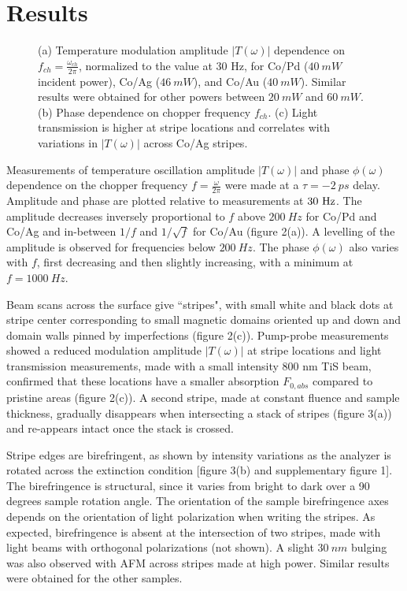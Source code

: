 \documentclass[5p]{elsarticle}
\begin{document}
\section{Results}

\begin{figure}
\centering{}
\caption{\label{fig:Figure1} (a) Temperature modulation amplitude $|T(\omega)|$ dependence on $f_{ch}=\frac{\omega_{ch}}{2 \pi}$, normalized to the value at 30 Hz, for Co/Pd ($40~mW$ incident power), Co/Ag ($46~mW$), and Co/Au ($40~mW$). Similar results were obtained for other powers between $20~mW$ and $60~mW$. (b) Phase dependence on chopper frequency $f_{ch}$. (c) Light transmission is higher at stripe locations and correlates with variations in $|T(\omega)|$ across Co/Ag stripes.}
\end{figure}

Measurements of temperature oscillation amplitude $|T(\omega)|$ and phase $\phi(\omega)$ dependence on the chopper frequency $f=\frac{\omega}{2 \pi}$ were made at a $\tau=-2~ps$ delay. Amplitude and phase are plotted relative to measurements at $\rm 30~Hz$. The amplitude decreases inversely proportional to $f$ above $200~Hz$ for Co/Pd and Co/Ag and in-between $1/f$ and $1/\sqrt{f}$ for Co/Au (figure 2(a)). A levelling of the amplitude is observed for frequencies below $200~Hz$. The phase $\phi(\omega)$ also varies with $f$, first decreasing and then slightly increasing, with a minimum at $f= 1000~Hz$.

Beam scans across the surface give ``stripes", with small white and black dots at stripe center corresponding to small magnetic domains oriented up and down and domain walls pinned by imperfections (figure 2(c)). Pump-probe measurements showed a reduced modulation amplitude $|T(\omega)|$ at stripe locations and light transmission measurements, made with a small intensity 800 nm TiS beam, confirmed that these locations have a smaller absorption $F_{0,abs}$ compared to pristine areas (figure 2(c)). A second stripe, made at constant fluence and sample thickness, gradually disappears when intersecting a stack of stripes (figure 3(a)) and re-appears intact once the stack is crossed.

Stripe edges are birefringent, as shown by intensity variations as the analyzer is rotated across the extinction condition [figure 3(b) and supplementary figure 1]. The birefringence is structural, since it varies from bright to dark over a 90 degrees sample rotation angle. The orientation of the sample birefringence axes depends on the orientation of light polarization when writing the stripes. As expected, birefringence is absent at the intersection of two stripes, made with light beams with orthogonal polarizations (not shown). A slight $30~nm$ bulging was also observed with AFM across stripes made at high power. Similar results were obtained for the other samples.
\end{document}

